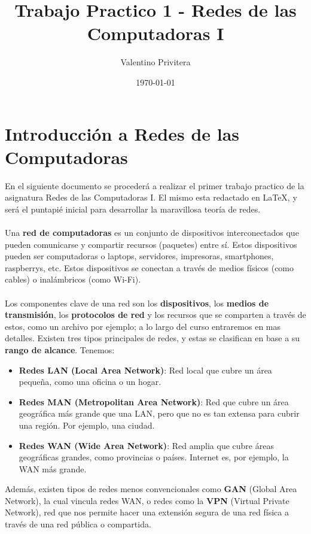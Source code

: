 \documentclass{article}
\title{\textbf{Trabajo Practico 1 - Redes de las Computadoras I}}
\author{Valentino Privitera}
\date{\today}
\begin{document}
\maketitle


\section{Introducción a Redes de las Computadoras}
En el siguiente documento se procederá a realizar el primer trabajo practico de la asignatura Redes de las Computadoras I. El mismo esta redactado en {\LaTeX}, y será el puntapié inicial para desarrollar la maravillosa teoría de redes.
\\ \\
Una \textbf{red de computadoras} es un conjunto de dispositivos interconectados que pueden comunicarse y compartir recursos (paquetes) entre sí. Estos dispositivos pueden ser computadoras o laptops, servidores, impresoras, smartphones, raspberrys, etc. Estos dispositivos se conectan a través de medios físicos (como cables) o inalámbricos (como Wi-Fi).
\\ \\
Los componentes clave de una red son los \textbf{dispositivos}, los \textbf{medios de transmisión}, los \textbf{protocolos de red} y los recursos que se comparten a través de estos, como un archivo por ejemplo; a lo largo del curso entraremos en mas detalles. Existen tres tipos principales de redes, y estas se clasifican en base a su \textbf{rango de alcance}. Tenemos: 

\begin{itemize}
    \item \textbf{Redes LAN (Local Area Network)}: Red local que cubre un área pequeña, como una oficina o un hogar.
    \item \textbf{Redes MAN (Metropolitan Area Network)}: Red que cubre un área geográfica más grande que una LAN, pero que no es tan extensa para cubrir una región. Por ejemplo, una ciudad.
    \item \textbf{Redes WAN (Wide Area Network)}: Red amplia que cubre áreas geográficas grandes, como provincias o países. Internet es, por ejemplo, la WAN más grande.
\end{itemize}

Además, existen tipos de redes menos convencionales como \textbf{GAN} (Global Area Network), la cual vincula redes WAN, o redes como la \textbf{VPN} (Virtual Private Network), red que nos permite hacer una extensión segura de una red física a través de una red pública o compartida. 
\end{document}
